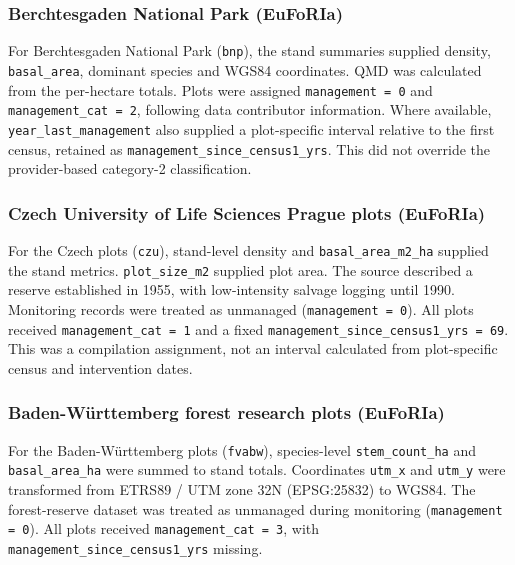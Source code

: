 \documentclass{myreport}
\begin{document}
% 

\subsubsection{Berchtesgaden National Park (EuFoRIa)}
For Berchtesgaden National Park (\texttt{bnp}), the stand summaries supplied density, \texttt{basal\_area}, dominant species and WGS84 coordinates. QMD was calculated from the per-hectare totals. Plots were assigned \texttt{management = 0} and \texttt{management\_cat = 2}, following data contributor information. Where available, \texttt{year\_last\_management} also supplied a plot-specific interval relative to the first census, retained as \texttt{management\_since\_census1\_yrs}. This did not override the provider-based category-2 classification.

% 

\subsubsection{Czech University of Life Sciences Prague plots (EuFoRIa)}
For the Czech plots (\texttt{czu}), stand-level density and \texttt{basal\_area\_m2\_ha} supplied the stand metrics. \texttt{plot\_size\_m2} supplied plot area. The source described a reserve established in 1955, with low-intensity salvage logging until 1990. Monitoring records were treated as unmanaged (\texttt{management = 0}). All plots received \texttt{management\_cat = 1} and a fixed \texttt{management\_since\_census1\_yrs = 69}. This was a compilation assignment, not an interval calculated from plot-specific census and intervention dates.

% 

\subsubsection{Baden-W\"urttemberg forest research plots (EuFoRIa)}
For the Baden-W\"urttemberg plots (\texttt{fvabw}), species-level \texttt{stem\_count\_ha} and \texttt{basal\_area\_ha} were summed to stand totals. Coordinates \texttt{utm\_x} and \texttt{utm\_y} were transformed from ETRS89 / UTM zone 32N (EPSG:25832) to WGS84. The forest-reserve dataset was treated as unmanaged during monitoring (\texttt{management = 0}). All plots received \texttt{management\_cat = 3}, with \texttt{management\_since\_census1\_yrs} missing.
\end{document}
